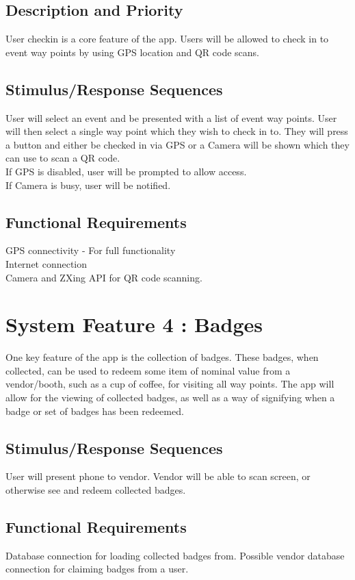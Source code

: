 \documentclass{scrreprt}
\begin{document}
\subsection{Description and Priority}
User checkin is a core feature of the app. Users will be allowed to check in to event way points by using GPS location and QR code scans.

\subsection{Stimulus/Response Sequences}
User will select an event and be presented with a list of event way points. User will then
select a single way point which they wish to check in to. They will press a button and either
be checked in via GPS or a Camera will be shown which they can use to scan a QR code. \\
If GPS is disabled, user will be prompted to allow access. \\
If Camera is busy, user will be notified.

\subsection{Functional Requirements}
GPS connectivity - For full functionality\\
Internet connection \\
Camera and ZXing API for QR code scanning.

\section{System Feature 4 : Badges}
One key feature of the app is the collection of badges. These badges, when collected,
can be used to redeem some item of nominal value from a vendor/booth, such as a
cup of coffee, for visiting all way points. The app will allow for the viewing of collected
badges, as well as a way of signifying when a badge or set of badges has been redeemed.

\subsection{Stimulus/Response Sequences}
User will present phone to vendor. Vendor will be able to scan screen, or otherwise
see and redeem collected badges.

\subsection{Functional Requirements}
Database connection for loading collected badges from. Possible vendor database connection
for claiming badges from a user.
\end{document}
